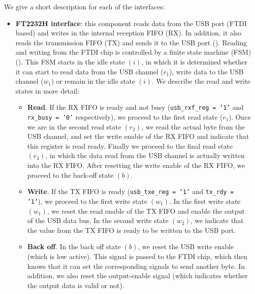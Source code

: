 %
\begin{figure}
	\centering
	
	\label{fig: usb_fsm}
\end{figure}
%
We give a short description for each of the interfaces:
%
\begin{itemize}
	\item \textbf{FT2232H interface}: this component reads data from the USB port (FTDI based) and writes in the internal reception FIFO (RX). 
	In addition, it also reads the transmission FIFO (TX) and sends it to the USB port ().
	Reading and writing from the FTDI chip is controlled by a finite state machine (FSM) ().  
	This FSM starts in the idle state $(i)$, in which it is determined whether it can start to read data from the USB channel ($r_1$), write data to the USB channel ($w_1$) or remain in the idle state $(i)$. 
	We describe the read and write states in more detail:
	\begin{itemize}
		\item \textbf{Read}. 
		If the RX FIFO is ready and not busy (\texttt{usb_rxf_reg = '1'} and \texttt{rx_busy = '0'} respectively), we proceed to the first read state ($r_1$). 
		Once we are in the second read state $(r_2)$, we read the actual byte from the USB channel, and set the write enable of the RX FIFO and indicate that this register is read ready. 
		Finally we proceed to the final read state $(r_3)$, in which the data read from the USB channel is actually written into the RX FIFO. 
		After resetting the write enable of the RX FIFO, we proceed to the back-off state $(b)$.
		
		\item \textbf{Write}.
		If the TX FIFO is ready (\texttt{usb_txe_reg = '1'} and \texttt{tx_rdy = '1'}), we proceed to the first write state $(w_1)$.
		In the first write state $(w_1)$, we reset the read enable of the TX FIFO and enable the output of the USB data bus. 
		In the second write state $(w_2)$, we indicate that the value from the TX FIFO is ready to be written to the USB port. 
		
		\item \textbf{Back off}.
		In the back off state $(b)$, we reset the USB write enable (which is low active).
		This signal is passed to the FTDI chip, which then knows that it can set the corresponding signals to send another byte.
		In addition, we also reset the output-enable signal (which indicates whether the output data is valid or not).
		

\end{itemize}
\end{itemize}
